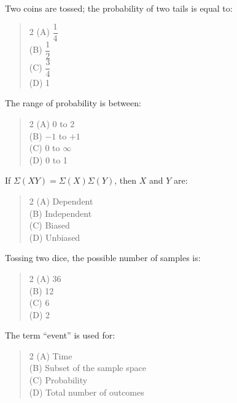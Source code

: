 \documentclass[11pt,a4paper]{article}
\begin{document}
\begin{mcqlist}
\item Two coins are tossed; the probability of two tails is equal to:
\begin{quote}\begin{multicols}{2}
\noindent (A) $\dfrac{1}{4}$ \\
(B) $\dfrac{1}{2}$ \\
(C) $\dfrac{3}{4}$ \\
(D) 1
\end{multicols}\end{quote}

\item The range of probability is between:
\begin{quote}\begin{multicols}{2}
\noindent (A) 0 to 2 \\
(B) $-1$ to $+1$ \\
(C) 0 to $\infty$ \\
(D) 0 to 1
\end{multicols}\end{quote}

\item If $\Sigma(XY)=\Sigma(X)\Sigma(Y)$, then $X$ and $Y$ are:
\begin{quote}\begin{multicols}{2}
\noindent (A) Dependent \\
(B) Independent \\
(C) Biased \\
(D) Unbiased
\end{multicols}\end{quote}

\item Tossing two dice, the possible number of samples is:
\begin{quote}\begin{multicols}{2}
\noindent (A) 36 \\
(B) 12 \\
(C) 6 \\
(D) 2
\end{multicols}\end{quote}

\item The term ``event'' is used for:
\begin{quote}\begin{multicols}{2}
\noindent (A) Time \\
(B) Subset of the sample space \\
(C) Probability \\
(D) Total number of outcomes
\end{multicols}\end{quote}


\end{mcqlist}
\end{document}
